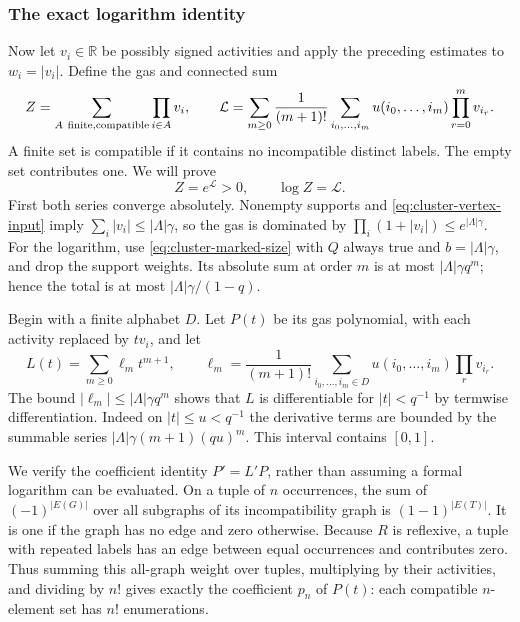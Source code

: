 \subsubsection{The exact logarithm identity}
Now let $v_i\in\mathbb R$ be possibly signed activities and apply the
preceding estimates to $w_i=|v_i|$. Define the gas and connected sum
\[
 Z=\sum_{A\ {\rm finite,compatible}}\prod_{i\in A}v_i,
 \qquad
 \mathcal L=\sum_{m\ge0}\frac1{(m+1)!}
         \sum_{i_0,\ldots,i_m}u(i_0,\ldots,i_m)\prod_{r=0}^m v_{i_r}.
\]
A finite set is compatible if it contains no incompatible distinct
labels. The empty set contributes one. We will prove
\begin{equation}\label{eq:cluster-exact-log}
                         Z=e^{\mathcal L}>0,\qquad \log Z=\mathcal L.
\end{equation}
First both series converge absolutely. Nonempty supports and
\eqref{eq:cluster-vertex-input} imply $\sum_i|v_i|\le|\Lambda|\gamma$,
so the gas is dominated by $\prod_i(1+|v_i|)\le e^{|\Lambda|\gamma}$.
For the logarithm, use \eqref{eq:cluster-marked-size} with $Q$ always
true and $b=|\Lambda|\gamma$, and drop the support weights. Its
absolute sum at order $m$ is at most $|\Lambda|\gamma q^m$; hence
the total is at most $|\Lambda|\gamma/(1-q)$.

Begin with a finite alphabet $D$. Let $P(t)$ be its gas polynomial,
with each activity replaced by $tv_i$, and let
\[
                 L(t)=\sum_{m\ge0}\ell_m t^{m+1},\qquad
 \ell_m=\frac1{(m+1)!}\sum_{i_0,\ldots,i_m\in D}
                                    u(i_0,\ldots,i_m)\prod_rv_{i_r}.
\]
The bound $|\ell_m|\le |\Lambda|\gamma q^m$ shows that $L$ is
differentiable for $|t|<q^{-1}$ by termwise differentiation. Indeed
on $|t|\le u<q^{-1}$ the derivative terms are bounded by the summable
series $|\Lambda|\gamma(m+1)(qu)^m$. This interval contains $[0,1]$.

We verify the coefficient identity $P'=L'P$, rather than assuming a
formal logarithm can be evaluated. On a tuple of $n$ occurrences,
the sum of $(-1)^{|E(G)|}$ over all subgraphs of its incompatibility
graph is $(1-1)^{|E(T)|}$. It is one if the graph has no edge and zero
otherwise. Because $R$ is reflexive, a tuple with repeated labels
has an edge between equal occurrences and contributes zero. Thus
summing this all-graph weight over tuples, multiplying by their
activities, and dividing by $n!$ gives exactly the coefficient $p_n$
of $P(t)$: each compatible $n$-element set has $n!$ enumerations.

